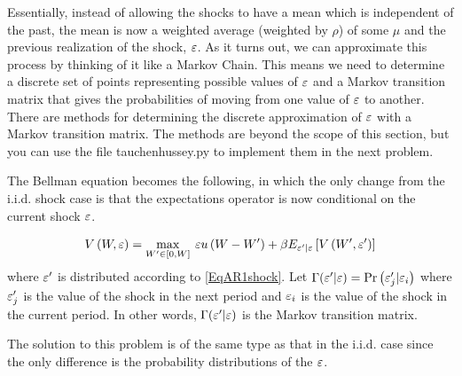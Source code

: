 Essentially, instead of allowing the shocks to have a mean which is independent of the past, the mean is now a weighted average (weighted by $\rho$) of some $\mu$ and the previous realization of the shock, $\varepsilon$.  As it turns out, we can approximate this process by thinking of it like a Markov Chain. This means we need to determine a discrete set of points representing possible values of $\varepsilon$ and a Markov transition matrix that gives the probabilities of moving from one value of $\varepsilon$ to another.  There are methods for determining the discrete approximation of $\varepsilon$ with a Markov transition matrix.  The methods are beyond the scope of this section, but you can use the file tauchenhussey.py to implement them in the next problem.

The Bellman equation becomes the following, in which the only change from the i.i.d. shock case is that the expectations operator is now conditional on the current shock $\varepsilon$.

\begin{equation*}
   V\left(W,\varepsilon\right) = \max_{W'\in[0,W]}\: \varepsilon u\left(W - W'\right) + \beta E_{\varepsilon'|\varepsilon}\left[V\left(W',\varepsilon'\right)\right]
\end{equation*}
where $\varepsilon'$ is distributed according to \eqref{EqAR1shock}. Let $\Gamma(\varepsilon'|\varepsilon)=\text{Pr}\left(\varepsilon_j'|\varepsilon_i\right)$ where $\varepsilon_j'$ is the value of the shock in the next period and $\varepsilon_i$ is the value of the shock in the current period.  In other words, $\Gamma(\varepsilon' | \varepsilon)$ is the Markov transition matrix.

The solution to this problem is of the same type as that in the i.i.d. case since the only difference is the probability distributions of the $\varepsilon$.

